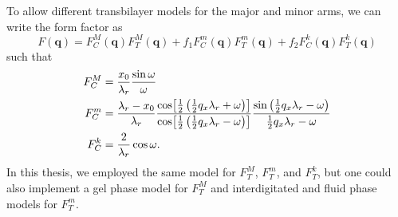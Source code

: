 To allow different transbilayer models for the major and minor arms,
we can write the form factor as
\begin{equation}
  F(\mathbf{q}) = F_C^M(\mathbf{q})F_T^M(\mathbf{q}) 
  + f_1F_C^m(\mathbf{q})F_T^m(\mathbf{q}) 
  + f_2F_C^k(\mathbf{q})F_T^k(\mathbf{q})
\end{equation}
such that
\begin{align}
  F_C^M &= \frac{x_0}{\lambda_r}\frac{\sin\omega}{\omega} \\
  F_C^m &= \frac{\lambda_r-x_0}{\lambda_r}
  \frac{\cos\mathopen{}\left[ \frac{1}{2}\left(\frac{1}{2}q_x\lambda_r + \omega\right) \right]\mathclose{}}
       {\cos\mathopen{}\left[ \frac{1}{2}\left(\frac{1}{2}q_x\lambda_r - \omega\right) \right]\mathclose{}}
  \frac{\sin\left(\frac{1}{2}q_x\lambda_r - \omega\right)}
       {\frac{1}{2}q_x\lambda_r - \omega} \\
  F_C^k &= \frac{2}{\lambda_r}\cos\omega.
  \label{eq:FC_split}
\end{align}
In this thesis, we employed the same model for $F_T^M$, $F_T^m$, and 
$F_T^k$, but one could also implement a gel phase model for $F_T^M$ and
interdigitated and fluid phase models for $F_T^m$.


